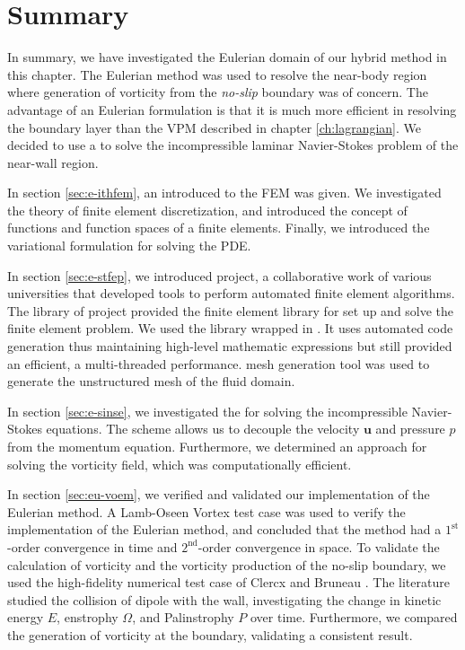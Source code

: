 \section{Summary}

In summary, we have investigated the Eulerian domain of our hybrid method in this chapter. The Eulerian method was used to resolve the near-body region where generation of vorticity from the \textit{no-slip} boundary was of concern. The advantage of an Eulerian formulation is that it is much more efficient in resolving the boundary layer than the VPM described in chapter \ref{ch:lagrangian}. We decided to use a  to solve the incompressible laminar Navier-Stokes problem of the near-wall region.

In section \ref{sec:e-ithfem}, an introduced to the FEM was given. We investigated the theory of finite element discretization, and introduced the concept of functions and function spaces of a finite elements. Finally, we introduced the variational formulation for solving the PDE.

In section \ref{sec:e-stfep}, we introduced \fenics project, a collaborative work of various universities that developed tools to perform automated finite element algorithms. The \dolfin library of \fenics project provided the finite element library for set up and solve the finite element problem. We used the \dolfin library wrapped in \python. It uses automated code generation thus maintaining high-level mathematic expressions but still provided an efficient, a multi-threaded performance. \gmsh mesh generation tool was used to generate the unstructured mesh of the fluid domain.

In section \ref{sec:e-sinse}, we investigated the  for solving the incompressible Navier-Stokes equations. The scheme allows us to decouple the velocity $\mathbf{u}$ and pressure $p$ from the momentum equation. Furthermore, we determined an approach for solving the vorticity field, which was computationally efficient.

In section \ref{sec:eu-voem}, we verified and validated our implementation of the Eulerian method. A Lamb-Oseen Vortex test case was used to verify the implementation of the Eulerian method, and concluded that the method had a $1^{\mathrm{st}}$-order convergence in time and $2^{\mathrm{nd}}$-order convergence in space. To validate the calculation of vorticity and the vorticity production of the no-slip boundary, we used the high-fidelity numerical test case of Clercx and Bruneau \cite{Clercx2006a}. The literature studied the collision of dipole with the wall, investigating the change in kinetic energy $E$, enstrophy $\Omega$, and Palinstrophy $P$ over time. Furthermore, we compared the generation of vorticity at the boundary, validating a consistent result. 

